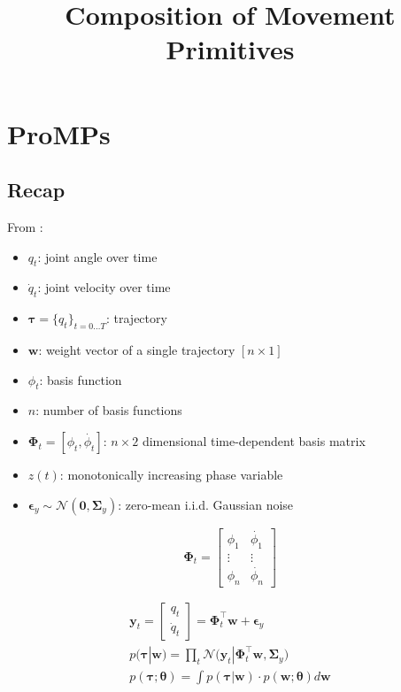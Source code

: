 \documentclass{article}
\title{Composition of Movement Primitives}
\begin{document}
\maketitle


\tableofcontents

\section{ProMPs}
\subsection{Recap}
From \citep{paraschos_probabilistic_2013, paraschos_using_2018}:
\begin{itemize}
    \item $q_t$: joint angle over time
    \item $\dot{q}_t$: joint velocity over time
    \item $\bm{\tau} = \{q_t\}_{t=0\dots T}$: trajectory
    \item $\bm{w}$: weight vector of a single trajectory $[n \times 1]$
    \item $\phi_t$: basis function
    \item $n$: number of basis functions
    \item $\bm{\Phi}_t = [\phi_t, \dot{\phi_t}]$: $n \times 2$ dimensional time-dependent basis matrix
    \item $z(t)$: monotonically increasing phase variable
    \item $\bm{\epsilon}_y \sim \mathcal{N}(\bm{0}, \bm{\Sigma}_y)$: zero-mean i.i.d. Gaussian noise
\end{itemize}

\begin{equation}
  \bm{\Phi}_t =
  \begin{bmatrix}
    \phi_1 & \dot{\phi_1}\\
    \vdots & \vdots\\
    \phi_n & \dot{\phi_n}
  \end{bmatrix}
\end{equation}

\begin{gather}
\bm{y}_t = \begin{bmatrix}
       q_t \\[0.3em]
       \dot{q}_t
     \end{bmatrix} = \bm{\Phi}^{\top}_{t}\bm{w} + \bm{\epsilon}_y\\
p(\bm{\tau}|\bm{w}) = \prod_t \mathcal{N}\Big(\bm{y}_t|\bm{\Phi}^{\top}_{t}\bm{w}, \bm{\Sigma}_y \Big)\\
p(\bm{\tau};\bm{\theta}) = \int p(\bm{\tau}|\bm{w}) \cdot p(\bm{w};\bm{\theta}) d\bm{w}
\end{gather}
\end{document}
